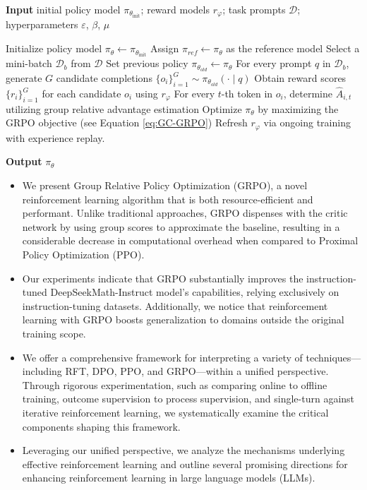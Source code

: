 \begin{algorithm}[t]
  \small
  \caption{Iterative Group Relative Policy Optimization}
  \textbf{Input} initial policy model $\pi_{\theta_{\text{init}}}$; reward models $r_\varphi$; task prompts $\mathcal{D}$; 
  hyperparameters $\varepsilon$, $\beta$, $\mu$
  \begin{algorithmic}[1]
    \State Initialize policy model $\pi_\theta \leftarrow \pi_{\theta_{\text{init}}}$
       \State Assign $\pi_{ref} \leftarrow \pi_{\theta}$ as the reference model
      \State Select a mini-batch $\mathcal{D}_b$ from $\mathcal{D}$
      \State Set previous policy $\pi_{\theta_{old}} \leftarrow \pi_{\theta}$ 
      \State For every prompt $q$ in $\mathcal{D}_b$, generate $G$ candidate completions $\{o_i\}_{i=1}^G \sim \pi_{\theta_{old}} (\cdot \mid q) $
      \State Obtain reward scores $\{r_i\}_{i=1}^{G}$ for each candidate $o_i$ using $r_{\varphi}$ 
      \State For every $t$-th token in $o_i$, determine $\hat{A}_{i,t}$ utilizing group relative advantage estimation
        \State Optimize $\pi_{\theta}$ by maximizing the GRPO objective (see Equation \ref{eq:GC-GRPO})
      \EndFor
    \EndFor \State Refresh $r_\varphi$ via ongoing training with experience replay.
    \EndFor 
  \end{algorithmic}
  \textbf{Output} $\pi_\theta$
  \label{alg:iter-grpo}
\end{algorithm}

\begin{itemize}[topsep=0pt]
    \item We present Group Relative Policy Optimization (GRPO), a novel reinforcement learning algorithm that is both resource-efficient and performant. Unlike traditional approaches, GRPO dispenses with the critic network by using group scores to approximate the baseline, resulting in a considerable decrease in computational overhead when compared to Proximal Policy Optimization (PPO).
    \item Our experiments indicate that GRPO substantially improves the instruction-tuned DeepSeekMath-Instruct model's capabilities, relying exclusively on instruction-tuning datasets. Additionally, we notice that reinforcement learning with GRPO boosts generalization to domains outside the original training scope.
    \item We offer a comprehensive framework for interpreting a variety of techniques—including RFT, DPO, PPO, and GRPO—within a unified perspective. Through rigorous experimentation, such as comparing online to offline training, outcome supervision to process supervision, and single-turn against iterative reinforcement learning, we systematically examine the critical components shaping this framework.
    \item Leveraging our unified perspective, we analyze the mechanisms underlying effective reinforcement learning and outline several promising directions for enhancing reinforcement learning in large language models (LLMs).
\end{itemize}

